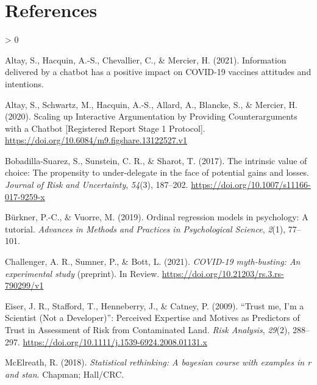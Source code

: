 \documentclass[
  english,
  ,jou,floatsintext]{apa6}
\newlength{\cslhangindent}
\newenvironment{CSLReferences}[2] %
 {%
  \setlength{\parindent}{0pt}
  \ifodd #1 \everypar{\setlength{\hangindent}{\cslhangindent}}\ignorespaces\fi
  \ifnum #2 > 0
  \setlength{\parskip}{#2\baselineskip}
  \fi
 }%
 {}
\begin{document}
\hypertarget{references}{%
\section*{References}\label{references}}

\hypertarget{refs}{}
\begin{CSLReferences}{1}{0}
\leavevmode\hypertarget{ref-altay2021information}{}%
Altay, S., Hacquin, A.-S., Chevallier, C., \& Mercier, H. (2021). Information delivered by a chatbot has a positive impact on COVID-19 vaccines attitudes and intentions.

\leavevmode\hypertarget{ref-altay_scaling_2020}{}%
Altay, S., Schwartz, M., Hacquin, A.-S., Allard, A., Blancke, S., \& Mercier, H. (2020). Scaling up {Interactive} {Argumentation} by {Providing} {Counterarguments} with a {Chatbot} {[}{Registered} {Report} {Stage} 1 {Protocol}{]}. \url{https://doi.org/10.6084/m9.figshare.13122527.v1}

\leavevmode\hypertarget{ref-bobadilla-suarez_intrinsic_2017}{}%
Bobadilla-Suarez, S., Sunstein, C. R., \& Sharot, T. (2017). The intrinsic value of choice: {The} propensity to under-delegate in the face of potential gains and losses. \emph{Journal of Risk and Uncertainty}, \emph{54}(3), 187--202. \url{https://doi.org/10.1007/s11166-017-9259-x}

\leavevmode\hypertarget{ref-burkner2019ordinal}{}%
Bürkner, P.-C., \& Vuorre, M. (2019). Ordinal regression models in psychology: A tutorial. \emph{Advances in Methods and Practices in Psychological Science}, \emph{2}(1), 77--101.

\leavevmode\hypertarget{ref-challenger_covid-19_2021}{}%
Challenger, A. R., Sumner, P., \& Bott, L. (2021). \emph{{COVID}-19 myth-busting: An experimental study} (preprint). In Review. \url{https://doi.org/10.21203/rs.3.rs-790299/v1}

\leavevmode\hypertarget{ref-eiser_trust_2009}{}%
Eiser, J. R., Stafford, T., Henneberry, J., \& Catney, P. (2009). {``{Trust} me, {I}'m a {Scientist} ({Not} a {Developer})''}: {Perceived} {Expertise} and {Motives} as {Predictors} of {Trust} in {Assessment} of {Risk} from {Contaminated} {Land}. \emph{Risk Analysis}, \emph{29}(2), 288--297. \url{https://doi.org/10.1111/j.1539-6924.2008.01131.x}

\leavevmode\hypertarget{ref-mcelreath2018statistical}{}%
McElreath, R. (2018). \emph{Statistical rethinking: A bayesian course with examples in r and stan}. Chapman; Hall/CRC.


\end{CSLReferences}
\end{document}
